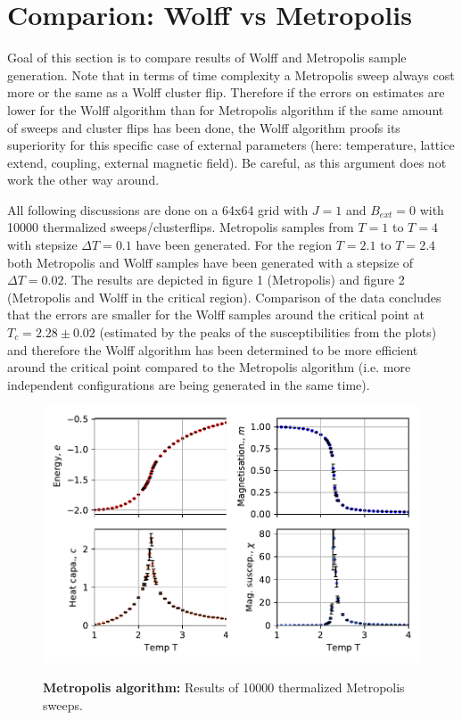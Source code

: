 \documentclass[11pt, a4paper]{scrartcl}
\begin{document}
\section{Comparion: Wolff vs Metropolis}
    Goal of this section is to compare results of Wolff and Metropolis sample generation. Note that in terms of time complexity a Metropolis sweep always cost more or the same as a Wolff cluster flip. Therefore if the errors on estimates are lower for the Wolff algorithm than for Metropolis algorithm if the same amount of sweeps and cluster flips has been done, the Wolff algorithm proofs its superiority for this specific case of external parameters (here: temperature, lattice extend, coupling, external magnetic field). Be careful, as this argument does not work the other way around.

    All following discussions are done on a 64x64 grid with $J = 1$ and $B_{ext} = 0$ with 10000 thermalized sweeps/clusterflips. Metropolis samples from $T = 1$ to $T = 4$ with stepsize $\Delta T = 0.1$ have been generated. For the region $T = 2.1$ to $T = 2.4$ both Metropolis and Wolff samples have been generated with a stepsize of $\Delta T = 0.02$. The results are depicted in figure 1 (Metropolis) and figure 2 (Metropolis and Wolff in the critical region). Comparison of the data concludes that the errors are smaller for the Wolff samples around the critical point at $T_c = 2.28 \pm 0.02$ (estimated by the peaks of the susceptibilities from the plots) and therefore the Wolff algorithm has been determined to be more efficient around the critical point compared to the Metropolis algorithm (i.e. more independent configurations are being generated in the same time).

    \begin{figure}
    \begin{centering}
        \includegraphics{obs_metro.pdf}
        \label{obs_metro}
        \caption{\textbf{Metropolis algorithm: } Results of 10000 thermalized Metropolis sweeps.}
    \end{centering}
    \end{figure}
\end{document}
